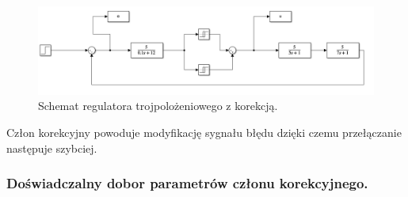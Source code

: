\documentclass[a4paper,10pt]{article}
\begin{document}
\begin{figure}[!h]
    \centering
	\includegraphics[width=120mm]{troj_kor_schemat.png}
	\caption{Schemat regulatora trojpolożeniowego z korekcją.}
    \label{fig:Rysunek}
\end{figure}
Człon korekcyjny powoduje modyfikację sygnału błędu dzięki czemu przełączanie następuje szybciej.
\newpage

\subsubsection{Doświadczalny dobor parametrów członu korekcyjnego.}\label{sec:zad2_2}
\end{document}
